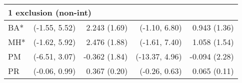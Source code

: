 \begin{table}[t]
\begin{tabular}{lrrrr}
\midrule
\multicolumn{5}{l}{1 exclusion (non-int)} \\ 
\midrule
\hspace{11.25pt} BA* & (-1.55, 5.52) & 2.243 (1.69) & (-1.10, 6.80) & 0.943 (1.36) \\ 
\hspace{11.25pt} MH* & (-1.62, 5.92) & 2.476 (1.88) & (-1.61, 7.40) & 1.058 (1.54) \\ 
\hspace{11.25pt} PM & (-6.51, 3.07) & -0.362 (1.84) & (-13.37, 4.96) & -0.094 (2.28) \\ 
\hspace{11.25pt} PR & (-0.06, 0.99) & 0.367 (0.20) & (-0.26, 0.63) & 0.065 (0.11) \\ 
\bottomrule
\end{tabular}
\end{table}

